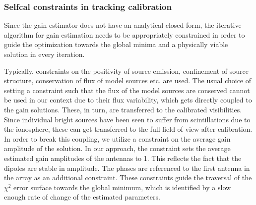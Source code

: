 \documentclass{aa}
\begin{document}
\begin{table}[tbh]
\caption{\label{tab:Details-of-model}Details of model sources used for All-sky
Selfcal. The $S_{60}$ has been generated using the spectral indices
of \cite{helmboldt2008radio}, while a secular decrease in the flux
of CasA of -0.8\% has been assumed. }
\end{table}



\subsubsection{Selfcal constraints in tracking calibration}

Since the gain estimator does not have an analytical closed form,
the iterative algorithm for gain estimation needs to be appropriately
constrained in order to guide the optimization towards the global
minima and a physically viable solution in every iteration.

Typically, constraints on the positivity of source emission, confinement
of source structure, conservation of flux of model sources etc. are
used. The usual choice of setting a constraint such that the flux
of the model sources are conserved cannot be used in our context due
to their flux variability, which gets directly coupled to the gain
solutions. These, in turn, are transferred to the calibrated visibilities.
Since individual bright sources have been seen to suffer from scintillations
due to the ionosphere, these can get transferred to the full field
of view after calibration. In order to break this coupling, we utilize
a constraint on the average gain amplitude of the solution. In our
approach, the constraint sets the average estimated gain amplitudes
of the antennas to 1. This reflects the fact that the dipoles are
stable in amplitude. The phases are referenced to the first antenna
in the array as an additional constraint. These constraints guide
the traversal of the $\chi^{2}$ error surface towards the global
minimum, which is identified by a slow enough rate of change of the
estimated parameters.
\end{document}
